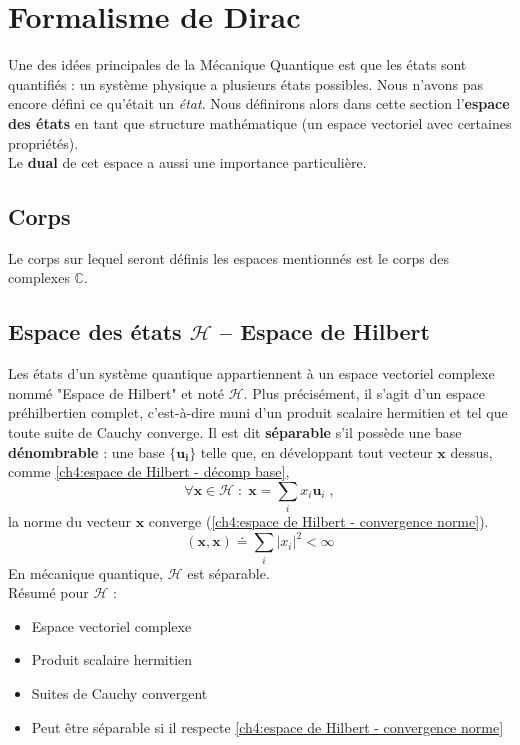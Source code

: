 \documentclass[../notesdecours.tex]{subfiles}
\begin{document}
\section{Formalisme de Dirac}
Une des idées principales de la Mécanique Quantique est que les états sont quantifiés : un système physique a plusieurs états possibles. Nous n'avons pas encore défini ce qu'était un \textit{état}. Nous définirons alors dans cette section l'\textbf{espace des états} en tant que structure mathématique (un espace vectoriel avec certaines propriétés). \\ Le \textbf{dual} de cet espace a aussi une importance particulière.

\subsection{Corps}
Le corps sur lequel seront définis les espaces mentionnés est le corps des complexes $\mathbb{C}$.

\subsection{Espace des états $\mathcal{H}$ -- Espace de Hilbert}
Les états d'un système quantique appartiennent à un espace vectoriel complexe nommé "Espace de Hilbert" et noté $\mathcal{H}$. Plus précisément, il s'agit d'un espace préhilbertien complet, c'est-à-dire muni d'un produit scalaire hermitien et tel que toute suite de Cauchy converge. Il est dit \textbf{séparable} s'il possède une base \textbf{dénombrable} : une base $\{\bm{u_i}\}$ telle que, en développant tout vecteur $\bm{x}$ dessus, comme \eqref{ch4:espace de Hilbert - décomp base}, 
\begin{equation}\label{ch4:espace de Hilbert - décomp base}
    \forall \bm{x} \in \mathcal{H} \; : \; \bm{x} = \sum_i x_i \bm{u}_i \; ,
\end{equation}
la norme du vecteur $\bm{x}$ converge (\eqref{ch4:espace de Hilbert - convergence norme}).
\begin{equation} \label{ch4:espace de Hilbert - convergence norme}
    (\bm{x}, \bm{x}) \doteq \sum_i |x_i| ^2 < \infty
\end{equation}
En mécanique quantique, $\mathcal{H}$ est séparable. \\

Résumé pour $\mathcal{H}$ :
\begin{itemize}
    \item Espace vectoriel complexe
    \item Produit scalaire hermitien
    \item Suites de Cauchy convergent
    \item Peut être séparable si il respecte \eqref{ch4:espace de Hilbert - convergence norme}
\end{itemize}
\end{document}

